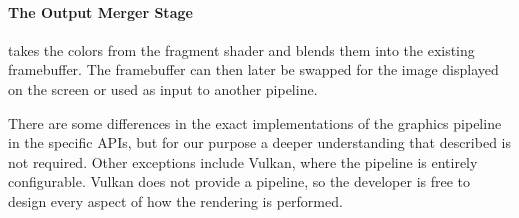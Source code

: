 \paragraph{The Output Merger Stage} takes the colors from the fragment shader and blends them into the existing framebuffer. 
The framebuffer can then later be swapped for the image displayed on the screen or used as input to another pipeline.

\vspace{1em}

\noindent There are some differences in the exact implementations of the graphics pipeline in the specific \glspl{API}, but for our purpose a deeper understanding that described is not required.
Other exceptions include Vulkan, where the pipeline is entirely configurable.
Vulkan does not provide a pipeline, so the developer is free to design every aspect of how the rendering is performed. 
